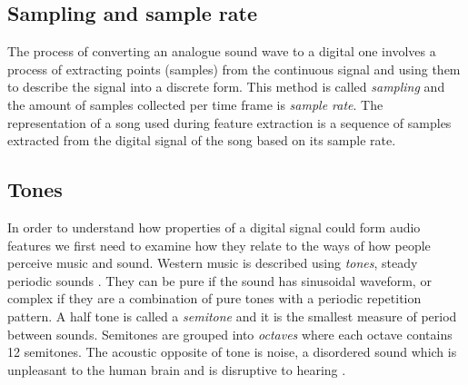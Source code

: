 \subsection{Sampling and sample rate}
\label{subsec:sampling}
The process of converting an analogue sound wave to a digital one involves a
process of extracting points (samples) from the continuous signal and using them
to describe the signal into a discrete form. This method is called
\textit{sampling} and the amount of samples collected per time frame is
\textit{sample rate}. The representation of a song used during feature
extraction is a sequence of samples extracted from the digital signal of the
song based on its sample rate.

\subsection{Tones}
\label{subsec:tones}
In order to understand how properties of a digital signal could form audio
features we first need to examine how they relate to the ways of how people
perceive music and sound. Western music is described using \textit{tones},
steady periodic sounds \cite{wiki:tone}. They can be pure if the sound has
sinusoidal waveform, or complex if they are a combination of pure tones with a
periodic repetition pattern. A half tone is called a \textit{semitone} and it is
the smallest measure of period between sounds. Semitones are grouped into
\textit{octaves} where each octave contains 12 semitones. The acoustic opposite
of tone is noise, a disordered sound which is unpleasant to the human brain and
is disruptive to hearing \cite{music-noise}.

